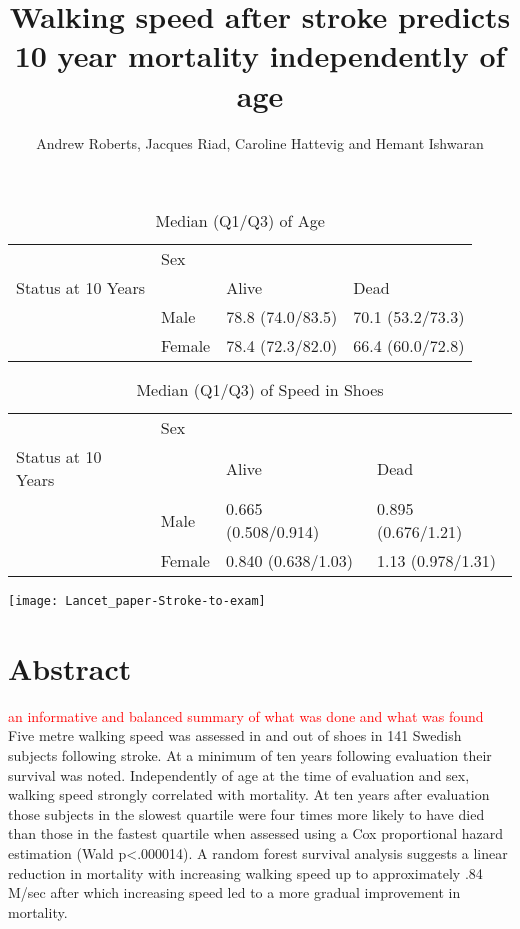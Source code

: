 \documentclass[a4paper,12pt]{article}
\author{Andrew Roberts, Jacques Riad, Caroline Hattevig and Hemant Ishwaran}
\title{Walking speed after stroke predicts 10 year mortality independently of age}
\begin{document}
\maketitle
\newpage


\begin{table}[ht]
\centering
\caption{Median (Q1/Q3) of Age} 
\begin{tabular}{llll}
  \hline
  \hline
 & Sex &  &  \\ 
  Status at 10 Years &  & Alive & Dead \\ 
   & Male & 78.8 (74.0/83.5) & 70.1 (53.2/73.3) \\ 
   & Female & 78.4 (72.3/82.0) & 66.4 (60.0/72.8) \\ 
   \hline
\end{tabular}
\end{table}%
\begin{table}[ht]
\centering
\caption{Median (Q1/Q3) of Speed in Shoes} 
\begin{tabular}{llll}
  \hline
  \hline
 & Sex &  &  \\ 
  Status at 10 Years &  & Alive & Dead \\ 
   & Male & 0.665 (0.508/0.914) & 0.895 (0.676/1.21) \\ 
   & Female & 0.840 (0.638/1.03) & 1.13 (0.978/1.31) \\ 
   \hline
\end{tabular}
\end{table}\texttt{[image: Lancet\_paper-Stroke-to-exam]}

\section{Abstract}  \textcolor{red}{an informative and balanced summary of what was done
and what was found} Five metre walking speed was assessed in and out of shoes in 141 Swedish subjects following stroke. At a minimum of ten years following evaluation their survival was noted. Independently of age at the time of evaluation and sex, walking speed strongly correlated with mortality. At ten years after evaluation those subjects in the slowest quartile were four times more likely to have died than those in the fastest quartile when assessed using a Cox proportional hazard estimation (Wald p<.000014). A random forest survival analysis suggests a linear reduction in mortality with increasing walking speed up to approximately .84 M/sec after which increasing speed led to a more gradual improvement in mortality.
\end{document}
